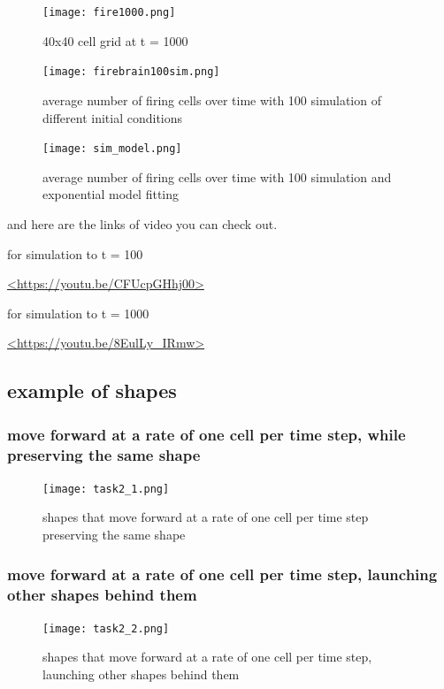 \documentclass[12pt]{article}
\begin{document}
\begin{figure}[H] %
\centering
\texttt{[image: fire1000.png]}
\caption{40x40 cell grid at t = 1000}
\label{fig:fire1000}
\end{figure}

\begin{figure}[H] %
\centering
\texttt{[image: firebrain100sim.png]}
\caption{average number of firing cells over time with 100 simulation of different initial conditions}
\label{fig:100sim}
\end{figure}

\begin{figure}[H] %
\centering
\texttt{[image: sim\_model.png]}
\caption{average number of firing cells over time with 100 simulation and exponential model fitting}
\label{fig:sim_model}
\end{figure}

and here are the links of video you can check out.\par 
for simulation to t = 100\par
\url{<https://youtu.be/CFUcpGHhj00>}\par
for simulation to t = 1000\par
\url{<https://youtu.be/8EulLy_IRmw>}\par




\subsection{example of shapes}

\subsubsection{move forward at a rate of one cell per time step, while preserving the same shape}
\begin{figure}[H] %
\centering
\texttt{[image: task2\_1.png]}
\caption{shapes that move forward at a rate of one cell per time step preserving the same shape}
\label{fig:task2_1}
\end{figure}

\subsubsection{move forward at a rate of one cell per time step, launching other shapes behind them}
\begin{figure}[H] %
\centering
\texttt{[image: task2\_2.png]}
\caption{shapes that move forward at a rate of one cell per time step, launching other shapes behind them}
\label{fig:task2_2}
\end{figure}
\end{document}
